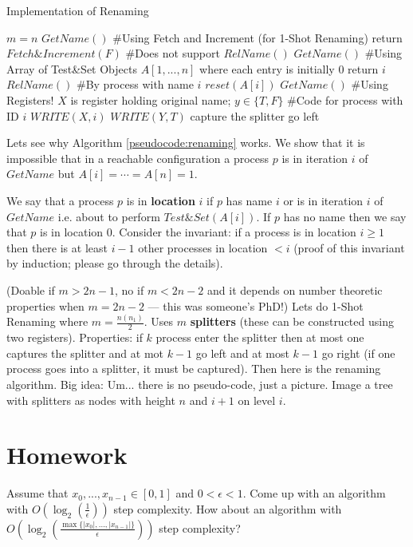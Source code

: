 \documentclass[twoside]{article}
\begin{document}
\begin{algorithm}
	\caption{Implementation of Renaming}
    \label{pseudocode:renaming}
    \begin{algorithmic}[1]
	\State $m = n$	
	\State $GetName()$ \#Using Fetch and Increment (for 1-Shot Renaming) 
	\State return $Fetch\&Increment(F)$ \#Does not support $RelName()$
	\State
	\State $GetName()$ \#Using Array of Test\&Set Objects $A[1, ..., n]$ where each entry is initially $0$
			\State return $i$
		\EndIf	
	\EndFor
	\State
	\State $RelName()$ \#By process with name $i$
	\State $reset(A[i])$	
	\State
	\State $GetName()$ \#Using Registers!
	\State $X$ is register holding original name; $y \in \{T, F\}$ \#Code for process with ID $i$
	\State $WRITE(X, i)$
		\State $WRITE(Y, T)$
	\EndIf
		\State capture the splitter
	\Else
		\State go left
	\EndIf	
	\end{algorithmic}
\end{algorithm}  

Lets see why Algorithm \ref{pseudocode:renaming} works. We show that it is impossible that in a reachable configuration a process $p$ is in iteration $i$ of $GetName$ but $A[i] = \cdots = A[n] = 1$.

We say that a process $p$ is in \textbf{location} $i$ if $p$ has name $i$ or is in iteration $i$ of $GetName$ i.e. about to perform $Test\&Set(A[i])$. If $p$ has no name then we say that $p$ is in location $0$. Consider the invariant: if a process is in location $i \geq 1$ then there is at least $i-1$ other processes in location $< i$ (proof of this invariant by induction; please go through the details).  

(Doable if $m > 2n-1$, no if $m < 2n-2$ and it depends on number theoretic properties when $m = 2n - 2$ --- this was someone's PhD!) Lets do 1-Shot Renaming where $m = \frac{n(n_1)}{2}$. Uses $m$ \textbf{splitters} (these can be constructed using two registers). Properties: if $k$ process enter the splitter then at most one captures the splitter and at mot $k-1$ go left and at most $k-1$ go right (if one process goes into a splitter, it must be captured). Then here is the renaming algorithm. Big idea: Um... there is no pseudo-code, just a picture. Image a tree with splitters as nodes with height $n$ and $i+1$ on level $i$.

\section{Homework}
Assume that $x_0, ..., x_{n-1} \in [0,1]$ and $0 < \epsilon < 1$. Come up with an algorithm with $O\left(\log_2\left(\frac{1}{\epsilon}\right)\right)$ step complexity. How about an algorithm with $O\left(\log_2\left(\frac{\max\{|x_0|, ..., |x_{n-1}|\}}{\epsilon}\right)\right)$ step complexity?
\end{document}
